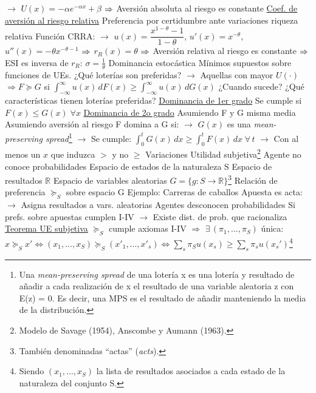 \documentclass{nuevotema}
\begin{document}
\begin{esquemal}
				\4[] $\to$ $U(x) = -\alpha e^{-\alpha x} + \beta$
				\4[] $\Rightarrow$ Aversión absoluta al riesgo es constante
				\4 \underline{Coef. de aversión al riesgo relativa}
				\4[] Preferencia por certidumbre ante variaciones riqueza relativa
				\4[] 
				\4[] Función CRRA:
				\4[] $\to$ $u(x) = \dfrac{x^{1-\theta}-1}{1-\theta}$, $u'(x) = x^{-\theta}$, $u''(x) = -\theta x^{-\theta - 1}$
				\4[] $\Rightarrow$ $r_R(x) = \theta$
				\4[] $\Rightarrow$ Aversión relativa al riesgo es constante
				\4[] $\Rightarrow$ ESI es inversa de $r_R$: $\sigma = \frac{1}{\theta}$
			\3 Dominancia estocástica
				\4 Mínimos supuestos sobre funciones de UEs.
				\4[] ¿Qué loterías son preferidas?
				\4[] $\to$ Aquellas con mayor $U(\cdot)$
				\4[] $\Rightarrow F \succeq G$ si $\int_{-\infty}^\infty u(x) \, dF(x) \geq \int_{-\infty}^\infty u(x) \, dG(x)$
				\4 ¿Cuando sucede?
				\4[] ¿Qué características tienen loterías preferidas?
				\4 \underline{Dominancia de 1er grado}
				\4[] Se cumple si $F(x) \leq G(x) \; \forall x$
				\4[] 
				\4 \underline{Dominancia de 2o grado}
				\4[] Asumiendo F y G misma media
				\4[] Asumiendo aversión al riesgo
				\4[] F domina a G si:
				\4[] $\to$  $G(x)$ es una \textit{mean-preserving spread}\footnote{Una \textit{mean-preserving spread} de una lotería x es una lotería y resultado de añadir a cada realización de x el resultado de una variable aleatoria z con E(z) = 0. Es decir, una MPS es el resultado de añadir  manteniendo la media de la distribución.}
				\4[] $\to$ Se cumple: $\int_0^t G(x) \, dx \geq \int_0^t F(x) \, dx \; \forall \, t$
				\4[] $\to$ Con al menos un $x$ que induzca $>$ y no $\geq$
		\2 Variaciones
			\3 Utilidad subjetiva\footnote{Modelo de Savage (1954), Anscombe y Aumann (1963).}
				\4 Agente no conoce probabilidades
				\4 Espacio de estados de la naturaleza S
				\4 Espacio de resultados $\mathbb{R}$
				\4 Espacio de variables aleatorias $G = \{ g: S \to \mathbb{R} \}$\footnote{También denominadas ``actas'' (\textit{acts}).}
				\4 Relación de preferencia $\succeq_S$ sobre espacio G
				\4 Ejemplo:
				\4[] Carreras de caballos
				\4[] Apuesta es acta:
				\4[] $\to$ Asigna resultados a vars. aleatorias
				\4[] Agentes desconocen probabilidades
				\4[] Si prefs. sobre apuestas cumplen I-IV
				\4[] $\to$ Existe dist. de prob. que racionaliza
				\4 \underline{Teorema UE subjetiva}
				\4[] $\succeq_S$ cumple axiomas I-IV $\Rightarrow$
				\4[] $\exists \, (\pi_1, ..., \pi_S)$ única:
				\4[] $x \succeq_S x' \iff (x_1, ..., x_S) \succeq_S (x'_1,...,x'_s) \iff \sum_s \pi_S u(x_s) \geq \sum_s \pi_s u(x_s')$\footnote{Siendo $(x_1, ..., x_S)$ la lista de resultados asociados a cada estado de la naturaleza del conjunto S.}

\end{esquemal}
\end{document}
